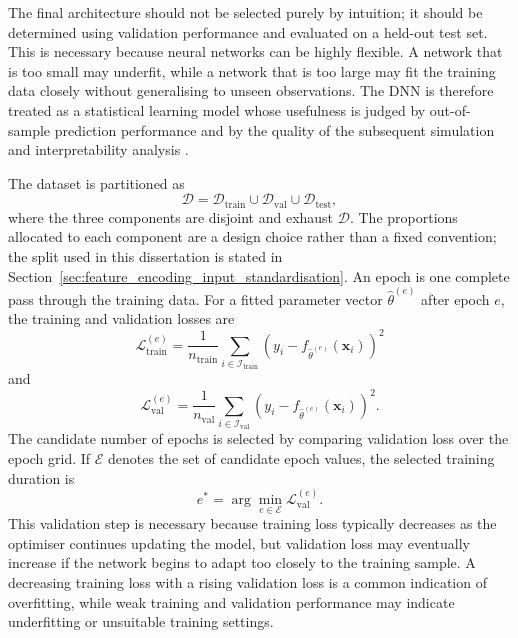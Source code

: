 \noindent
The final architecture should not be selected purely by intuition; it should be
determined using validation performance and evaluated on a held-out test set.
This is necessary because neural networks can be highly flexible. A network that
is too small may underfit, while a network that is too large may fit the
training data closely without generalising to unseen observations. The
DNN is therefore treated as a statistical learning model whose usefulness
is judged by out-of-sample prediction performance and by the quality of the
subsequent simulation and interpretability analysis
\citep{james2021introduction,hastie2009elements}.

\noindent
The dataset is partitioned as
\begin{equation}
\label{eq:data_partition}
    \mathcal{D}
    =
    \mathcal{D}_{\mathrm{train}}
    \cup
    \mathcal{D}_{\mathrm{val}}
    \cup
    \mathcal{D}_{\mathrm{test}},
\end{equation}
where the three components are disjoint and exhaust \(\mathcal{D}\).  The
proportions allocated to each component are a design choice rather than a
fixed convention; the split used in this dissertation is stated in
Section~\ref{sec:feature_encoding_input_standardisation}. An epoch is one
complete pass through the training data. For a fitted parameter vector
\(\widehat{\theta}^{(e)}\) after epoch \(e\), the training and validation losses
are
\begin{equation}
\label{eq:training_loss_epoch}
    \mathcal{L}_{\mathrm{train}}^{(e)}
    =
    \frac{1}{n_{\mathrm{train}}}
    \sum_{i\in\mathcal{I}_{\mathrm{train}}}
    \left(
        y_i
        -
        f_{\widehat{\theta}^{(e)}}(\mathbf{x}_i)
    \right)^2
\end{equation}
and
\begin{equation}
\label{eq:validation_loss_epoch}
    \mathcal{L}_{\mathrm{val}}^{(e)}
    =
    \frac{1}{n_{\mathrm{val}}}
    \sum_{i\in\mathcal{I}_{\mathrm{val}}}
    \left(
        y_i
        -
        f_{\widehat{\theta}^{(e)}}(\mathbf{x}_i)
    \right)^2.
\end{equation}
The candidate number of epochs is selected by comparing validation loss over the
epoch grid. If \(\mathcal{E}\) denotes the set of candidate epoch values, the
selected training duration is
\begin{equation}
\label{eq:epoch_selection}
    e^{\ast}
    =
    \arg\min_{e\in\mathcal{E}}
    \mathcal{L}_{\mathrm{val}}^{(e)}.
\end{equation}
This validation step is necessary because training loss typically decreases as
the optimiser continues updating the model, but validation loss may eventually
increase if the network begins to adapt too closely to the training sample. A
decreasing training loss with a rising validation loss is a common indication of
overfitting, while weak training and validation performance may indicate
underfitting or unsuitable training settings.

